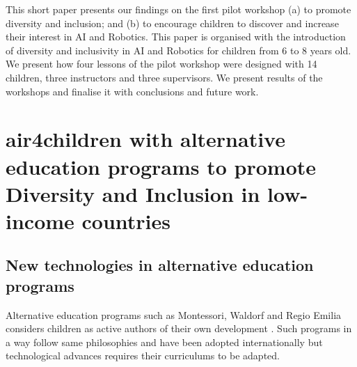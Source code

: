 \documentclass[conference]{IEEEtran}
\begin{document}
This short paper presents our findings on the first pilot workshop (a) to promote diversity and inclusion; and (b) to encourage children to discover and increase their interest in AI and Robotics.
This paper is organised with the introduction of diversity and inclusivity in AI and Robotics for children from 6 to 8 years old.
We present how four lessons of the pilot workshop were designed with 14 children, three instructors and three supervisors. 
We present results of the workshops and finalise it with conclusions and future work.



\section{air4children with alternative education programs to promote Diversity and Inclusion in low-income countries}

\subsection{New technologies in alternative education programs}
Alternative education programs such as Montessori, Waldorf and Regio Emilia considers children as active authors of their own development \cite{edwards2002}.
Such programs in a way follow same philosophies and have been adopted internationally but technological advances requires their curriculums to be adapted. 
\end{document}
